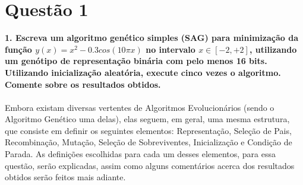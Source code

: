 \documentclass{report}
\begin{document}
	

	\section*{Questão 1}
	
	\textbf{1. Escreva um algoritmo genético simples (SAG) para minimização da função $y(x) = x^2 - 0.3cos(10 \pi x)$ no intervalo $x \in [-2, +2]$, utilizando um genótipo de representação binária com pelo menos 16 bits. Utilizando inicialização aleatória, execute cinco vezes o algoritmo. Comente sobre os resultados obtidos.}\\

	\paragraph{} Embora existam diversas vertentes de Algoritmos Evolucionários (sendo o Algoritmo Genético uma delas), elas seguem, em geral, uma mesma estrutura, que consiste em definir os seguintes elementos: Representação, Seleção de Pais, Recombinação, Mutação, Seleção de Sobreviventes, Inicialização e Condição de Parada. As definições escolhidas para cada um desses elementos, para essa questão, serão explicadas, assim como alguns comentários acerca dos resultados obtidos serão feitos mais adiante.\\
	
\end{document}
